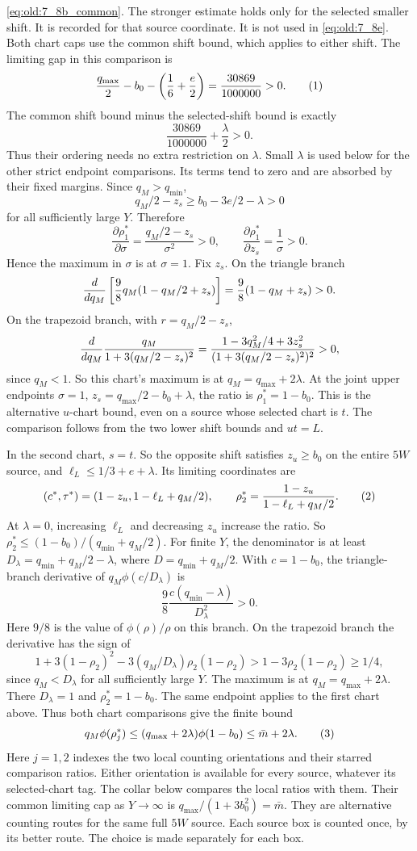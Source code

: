 \eqref{eq:old:7_8b_common}.
The stronger estimate holds only for the selected smaller shift. It is
recorded for that source coordinate. It is not used in \eqref{eq:old:7_8e}.
Both chart caps use the common shift bound, which applies to either shift. The limiting
gap in this comparison is
\[
 \frac{q_{\max}}2-b_0-\left(\frac16+\frac e2\right)
 =\frac{30869}{1000000}>0.
\AutoTag{eq:old:7_8b_gap}
\]
The common shift bound minus the selected-shift bound is exactly
\[
 \frac{30869}{1000000}+\frac{\lambda}{2}>0.
\]
Thus their ordering needs no extra restriction on \(\lambda\). Small
\(\lambda\) is used below for the other strict endpoint comparisons. Its
terms tend to zero and are absorbed by their fixed margins.
Since \(q_M>q_{\min}\),
\[
 q_M/2-z_s\ge b_0-3e/2-\lambda>0
\]
for all sufficiently large \(Y\). Therefore
\[
 \frac{\partial\rho_1^*}{\partial\sigma}
 =\frac{q_M/2-z_s}{\sigma^2}>0,\qquad
 \frac{\partial\rho_1^*}{\partial z_s}=\frac1{\sigma}>0.
\]
Hence the maximum in \(\sigma\) is at \(\sigma=1\).
Fix \(z_s\). On the triangle branch
\[
 {d\over dq_M}\left[{9\over8}q_M(1-q_M/2+z_s)\right]
 ={9\over8}(1-q_M+z_s)>0.
\]
On the trapezoid branch, with \(r=q_M/2-z_s\),
\[
 {d\over dq_M}{q_M\over1+3(q_M/2-z_s)^2}
 ={1-3q_M^2/4+3z_s^2\over(1+3(q_M/2-z_s)^2)^2}>0,
\]
since \(q_M<1\). So this chart's maximum is at
\(q_M=q_{\max}+2\lambda\). At the joint upper endpoints
\(\sigma=1\), \(z_s=q_{\max}/2-b_0+\lambda\), the ratio is
\(\rho_1^*=1-b_0\). This is the alternative \(u\)-chart bound, even on a
source whose selected chart is \(t\). The comparison follows from the two
lower shift bounds and \(ut=L\).

In the second chart, \(s=t\). So the opposite shift satisfies
\(z_u\ge b_0\) on the entire \(5W\) source, and
\(\ell_L\le1/3+e+\lambda\). Its limiting coordinates are
\[
 (c^*,\tau^*)=(1-z_u,1-\ell_L+q_M/2),
 \qquad \rho_2^*={1-z_u\over1-\ell_L+q_M/2}.
\AutoTag{eq:old:7_8d}
\]
At \(\lambda=0\), increasing \(\ell_L\) and decreasing \(z_u\) increase
the ratio. So
\(\rho_2^*\le(1-b_0)/(q_{\min}+q_M/2)\). For finite \(Y\), the
denominator is at least \(D_\lambda=q_{\min}+q_M/2-\lambda\), where
\(D=q_{\min}+q_M/2\). With \(c=1-b_0\), the triangle-branch derivative
of \(q_M\phi(c/D_\lambda)\) is
\[
 \frac98\frac{c(q_{\min}-\lambda)}{D_\lambda^2}>0.
\]
Here \(9/8\) is the value of \(\phi(\rho)/\rho\) on this branch.
On the trapezoid branch the derivative has the sign of
\[
 1+3(1-\rho_2)^2-3(q_M/D_\lambda)\rho_2(1-\rho_2)
 >1-3\rho_2(1-\rho_2)\ge1/4,
\]
since \(q_M<D_\lambda\) for all sufficiently large \(Y\). The maximum
is at \(q_M=q_{\max}+2\lambda\). There \(D_\lambda=1\) and
\(\rho_2^*=1-b_0\). The same endpoint applies to the first chart above.
Thus both chart comparisons give the finite bound
\[
 q_M\phi(\rho_j^*)\le(q_{\max}+2\lambda)\phi(1-b_0)
 \le\bar m+2\lambda.
\AutoTag{eq:old:7_8e}
\]
Here \(j=1,2\) indexes the two local counting orientations and their
starred comparison ratios. Either orientation is available for every
source, whatever its selected-chart tag. The collar below compares the
local ratios with them.
Their common limiting cap as \(Y\to\infty\) is
\(q_{\max}/(1+3b_0^2)=\bar m\). They are alternative counting routes
for the same full \(5W\) source. Each source box is counted once, by its
better route. The choice is made separately for each box.

